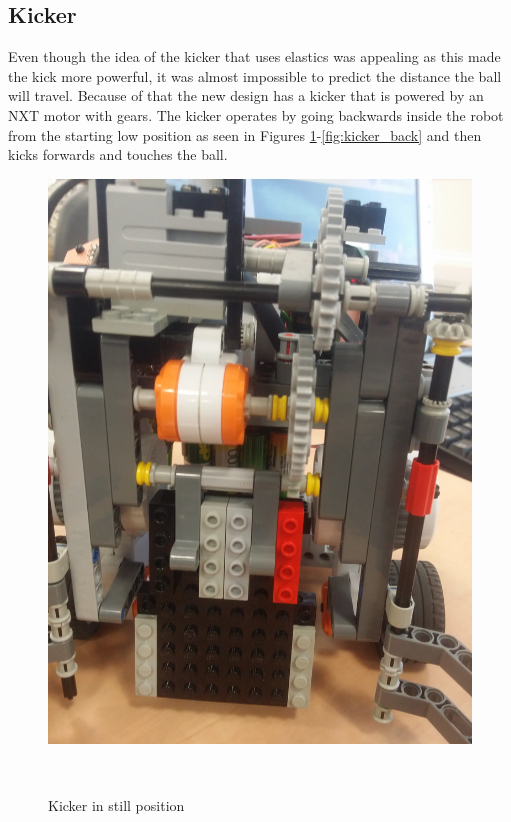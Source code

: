 \documentclass[12pt]{article}
\begin{document}
\subsection{Kicker}
Even though the idea of the kicker that uses elastics was appealing as this made
the kick more powerful, it was almost impossible to predict the distance the
ball will travel. Because of that the new design has a
kicker that is powered by an NXT motor with gears. The kicker operates by going backwards inside the robot from the starting low position as seen in Figures \ref{fig:kicker}-\ref{fig:kicker_back} and then kicks
forwards and touches the ball.
\begin{figure}[ht]
	\centering
	\begin{minipage}[b]{.3\textwidth}
        \centering
		\includegraphics[scale=0.04, angle=-90]{kick_front.jpg}
		\caption{Kicker in still position}
		\label{fig:kicker}
	\end{minipage}
	~
	\begin{minipage}[b]{.3\textwidth}

\end{minipage}
\end{figure}
\end{document}
